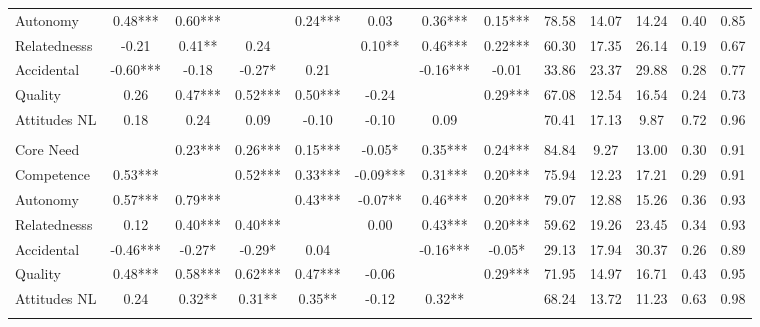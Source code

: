 \begin{table}
\begin{minipage}[t][\textheight][t]{\textwidth}
{\begin{tabular}[t]{lcccccccccccc}
\hspace{1em}Autonomy & 0.48*** & 0.60*** &  & 0.24*** & 0.03 & 0.36*** & 0.15*** & 78.58 & 14.07 & 14.24 & 0.40 & 0.85\\
\hspace{1em}Relatednesss & -0.21 & 0.41** & 0.24 &  & 0.10** & 0.46*** & 0.22*** & 60.30 & 17.35 & 26.14 & 0.19 & 0.67\\
\hspace{1em}Accidental & -0.60*** & -0.18 & -0.27* & 0.21 &  & -0.16*** & -0.01 & 33.86 & 23.37 & 29.88 & 0.28 & 0.77\\
\hspace{1em}Quality & 0.26 & 0.47*** & 0.52*** & 0.50*** & -0.24 &  & 0.29*** & 67.08 & 12.54 & 16.54 & 0.24 & 0.73\\
\hspace{1em}Attitudes NL & 0.18 & 0.24 & 0.09 & -0.10 & -0.10 & 0.09 &  & 70.41 & 17.13 & 9.87 & 0.72 & 0.96\\
\addlinespace[0.3em]
\multicolumn{13}{l}{\textbf{Study 3}}\\
\hspace{1em}Core Need &  & 0.23*** & 0.26*** & 0.15*** & -0.05* & 0.35*** & 0.24*** & 84.84 & 9.27 & 13.00 & 0.30 & 0.91\\
\hspace{1em}Competence & 0.53*** &  & 0.52*** & 0.33*** & -0.09*** & 0.31*** & 0.20*** & 75.94 & 12.23 & 17.21 & 0.29 & 0.91\\
\hspace{1em}Autonomy & 0.57*** & 0.79*** &  & 0.43*** & -0.07** & 0.46*** & 0.20*** & 79.07 & 12.88 & 15.26 & 0.36 & 0.93\\
\hspace{1em}Relatednesss & 0.12 & 0.40*** & 0.40*** &  & 0.00 & 0.43*** & 0.20*** & 59.62 & 19.26 & 23.45 & 0.34 & 0.93\\
\hspace{1em}Accidental & -0.46*** & -0.27* & -0.29* & 0.04 &  & -0.16*** & -0.05* & 29.13 & 17.94 & 30.37 & 0.26 & 0.89\\
\hspace{1em}Quality & 0.48*** & 0.58*** & 0.62*** & 0.47*** & -0.06 &  & 0.29*** & 71.95 & 14.97 & 16.71 & 0.43 & 0.95\\
\hspace{1em}Attitudes NL & 0.24 & 0.32** & 0.31** & 0.35** & -0.12 & 0.32** &  & 68.24 & 13.72 & 11.23 & 0.63 & 0.98\\
\addlinespace[0.3em]
\multicolumn{13}{l}{\textbf{Across Studies}}\\

\end{tabular}}
\end{minipage}
\end{table}
